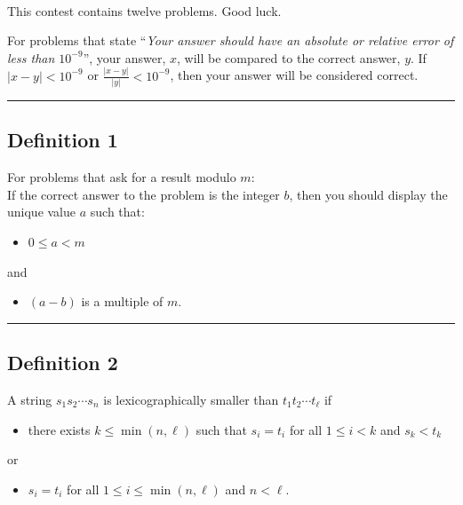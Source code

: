 \documentclass[noproblemids,a4paper]{problemset}
\begin{document}
\clearpage

~
\vskip 40pt

\begin{center}
This contest contains twelve problems. Good luck.
\end{center}

\vskip 20pt
For problems that state ``\textit{Your answer should have an absolute or relative error of less than $10^{-9}$}'', your answer, $x$, will be compared to the correct answer, $y$. If $|x-y| < 10^{-9}$ or $\frac{|x-y|}{|y|} < 10^{-9}$, then your answer will be considered correct.


\vskip 20pt
\hrule
\vskip 20pt

\subsection*{Definition 1}

For problems that ask for a result modulo $m$: \\ If the correct answer to the problem is the integer $b$, then you should display the unique value $a$ such that:


\begin{itemize}
\item $0 \leq a < m$
\end{itemize}

\vskip-10pt
\hskip30pt and

\begin{itemize}
\item \vskip-10pt $(a-b)$ is a multiple of $m$.
\end{itemize}

\vskip 20pt
\hrule
\vskip 20pt

\subsection*{Definition 2}

A string $s_1s_2 \cdots s_n$ is lexicographically smaller than $t_1t_2\cdots t_\ell$ if

\begin{itemize}
\item there exists $k \leq \min(n,\ell)$ such that $s_i = t_i$ for all $1 \leq i < k$ and $s_k < t_k$
\end{itemize}

\vskip-10pt
\hskip30pt or

\begin{itemize}
\item \vskip-10pt $s_i = t_i$ for all $1 \leq i \leq \min(n,\ell)$ and $n < \ell$.
\end{itemize}
\end{document}

